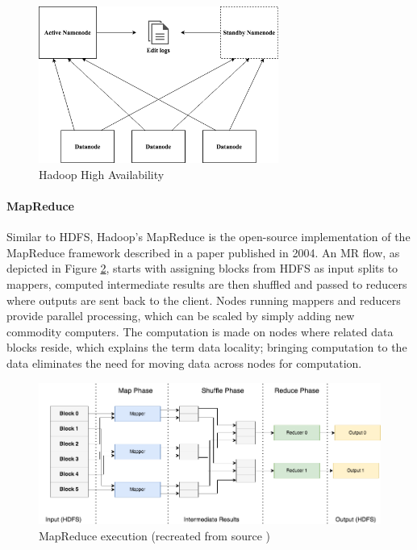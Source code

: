 \documentclass[review]{elsarticle}
\begin{document}
\begin{figure}[h!]
	\caption{Hadoop High Availability}
	\label{fig:HadoopHA}
	\includegraphics[width=0.7\textwidth]{HadoopHA}
	\centering
\end{figure}

\paragraph{MapReduce} 
Similar to HDFS, Hadoop's MapReduce is the open-source implementation of the MapReduce framework described in a paper \cite{dean_mapreduce_2004} published in 2004. An MR flow, as depicted in Figure \ref{fig:MapReduce}, starts with assigning blocks from HDFS as input splits to mappers, computed intermediate results are then shuffled and passed to reducers where outputs are sent back to the client. Nodes running mappers and reducers provide parallel processing, which can be scaled by simply adding new commodity computers. The computation is made on nodes where related data blocks reside, which explains the term data locality; bringing computation to the data eliminates the need for moving data across nodes for computation.

\begin{figure}[h!]
	\caption{MapReduce execution (recreated from source \cite{schatzle_giant_nodate})}
	\label{fig:MapReduce}
	\includegraphics[width=\textwidth]{MapReduce}
	\centering
\end{figure}
\end{document}
